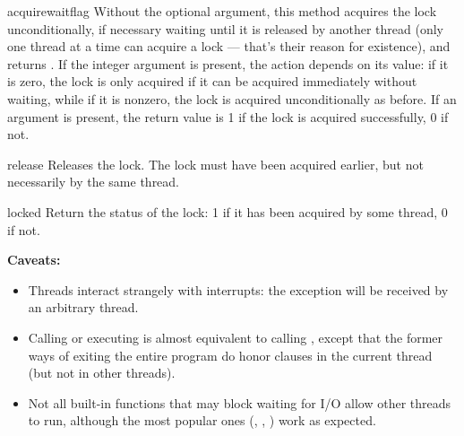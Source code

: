 \renewcommand{\indexsubitem}{(lock method)}
\begin{funcdesc}{acquire}{waitflag}
Without the optional argument, this method acquires the lock
unconditionally, if necessary waiting until it is released by another
thread (only one thread at a time can acquire a lock --- that's their
reason for existence), and returns .  If the integer
 argument is present, the action depends on its value:
if it is zero, the lock is only acquired if it can be acquired
immediately without waiting, while if it is nonzero, the lock is
acquired unconditionally as before.  If an argument is present, the
return value is 1 if the lock is acquired successfully, 0 if not.
\end{funcdesc}

\begin{funcdesc}{release}{}
Releases the lock.  The lock must have been acquired earlier, but not
necessarily by the same thread.
\end{funcdesc}

\begin{funcdesc}{locked}{}
Return the status of the lock: 1 if it has been acquired by some
thread, 0 if not.
\end{funcdesc}

{\bf Caveats:}

\begin{itemize}
\item
Threads interact strangely with interrupts: the
 exception will be received by an arbitrary
thread.

\item
Calling  or executing
 is almost equivalent to calling
, except that the former ways of
exiting the entire program do honor  clauses in the
current thread (but not in other threads).

\item
Not all built-in functions that may block waiting for I/O allow other
threads to run, although the most popular ones (,
, ) work as expected.

\end{itemize}
